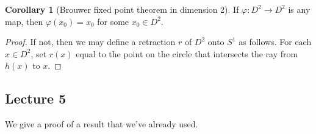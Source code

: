 \documentclass[10pt,letterpaper,cm]{nupset}
\theoremstyle{definition}
\theoremstyle{theorem}
\newtheorem{corollary}[definition]{Corollary}
\theoremstyle{remark}
\newcommand{\1}{\mathbb{1}}
\newcommand{\0}{\vec 0}
\begin{document}
\begin{corollary}[Brouwer fixed point theorem in dimension 2]
If $\varphi : D^2 \to D^2$ is  any map, then $\varphi(x_0) = x_0$ for some $x_0 \in D^2$.
\end{corollary}
\begin{proof}
If not, then we may define a retraction $r$ of $D^2$ onto $S^1$ as follows. For each $x\in D^2$, set $r(x)$ equal to the point on the circle that intersects  the ray from $h(x)$ to $x$. 
\end{proof}

\subsection{Lecture 5}

We give a proof of a result that we've already used.
\end{document}
